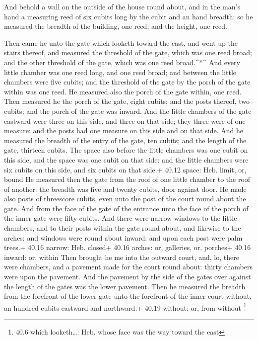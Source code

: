  And behold a wall on the outside of the house round about,
and in the man's hand a measuring reed of six cubits long by the cubit
and an hand breadth: so he measured the breadth of the building, one
reed; and the height, one reed.

 Then came he unto the gate which looketh toward the east,
and went up the stairs thereof, and measured the threshold of the gate,
which was one reed broad; and the other threshold of the gate, which was
one reed broad.\^{}*\^{}  And every little chamber was one
reed long, and one reed broad; and between the little chambers were five
cubits; and the threshold of the gate by the porch of the gate within
was one reed.  He measured also the porch of the gate
within, one reed.  Then measured he the porch of the gate,
eight cubits; and the posts thereof, two cubits; and the porch of the
gate was inward.  And the little chambers of the gate
eastward were three on this side, and three on that side; they three
were of one measure: and the posts had one measure on this side and on
that side.  And he measured the breadth of the entry of the
gate, ten cubits; and the length of the gate, thirteen cubits.
 The space also before the little chambers was one cubit on
this side, and the space was one cubit on that side: and the little
chambers were six cubits on this side, and six cubits on that side.+
40.12 space: Heb. limit, or, bound  He measured then the
gate from the roof of one little chamber to the roof of another: the
breadth was five and twenty cubits, door against door.  He
made also posts of threescore cubits, even unto the post of the court
round about the gate.  And from the face of the gate of the
entrance unto the face of the porch of the inner gate were fifty cubits.
 And there were narrow windows to the little chambers, and
to their posts within the gate round about, and likewise to the arches:
and windows were round about inward: and upon each post were palm
trees.+ 40.16 narrow: Heb. closed+ 40.16 arches: or, galleries, or,
porches+ 40.16 inward: or, within  Then brought he me into
the outward court, and, lo, there were chambers, and a pavement made for
the court round about: thirty chambers were upon the pavement.
 And the pavement by the side of the gates over against the
length of the gates was the lower pavement.  Then he
measured the breadth from the forefront of the lower gate unto the
forefront of the inner court without, an hundred cubits eastward and
northward.+ 40.19 without: or, from without \footnote{40.6 which
  looketh\ldots: Heb. whose face was the way toward the east}

